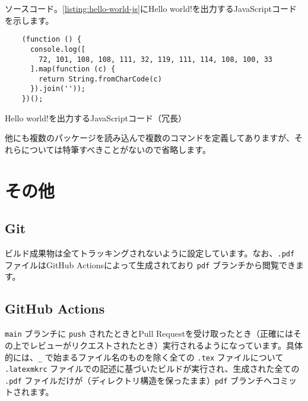 \documentclass[a4paper]{ltjsarticle}
\begin{document}
ソースコード。\cref{listing:hello-world-js}にHello world!を出力するJavaScriptコードを示します。
\begin{longlisting}
  \begin{verbatim}
    (function () {
      console.log([
        72, 101, 108, 108, 111, 32, 119, 111, 114, 108, 100, 33
      ].map(function (c) {
        return String.fromCharCode(c)
      }).join(''));
    })();
  \end{verbatim}
  \caption{Hello world!を出力するJavaScriptコード（冗長）}
  \label{listing:hello-world-js}
\end{longlisting}

他にも複数のパッケージを読み込んで複数のコマンドを定義してありますが、それらについては特筆すべきことがないので省略します。

\section{その他}

\subsection{Git}
ビルド成果物は全てトラッキングされないように設定しています。なお、\texttt{.pdf} ファイルはGitHub Actionsによって生成されており \texttt{pdf} ブランチから閲覧できます。

\subsection{GitHub Actions}
\texttt{main} ブランチに \texttt{push} されたときとPull Requestを受け取ったとき（正確にはその上でレビューがリクエストされたとき）実行されるようになっています。具体的には、\texttt{\_} で始まるファイル名のものを除く全ての \texttt{.tex} ファイルについて \texttt{.latexmkrc} ファイルでの記述に基づいたビルドが実行され、生成された全ての \texttt{.pdf} ファイルだけが（ディレクトリ構造を保ったまま）\texttt{pdf} ブランチへコミットされます。

\printbibliography[title={参考文献}, heading=bibnumbered]
\end{document}

